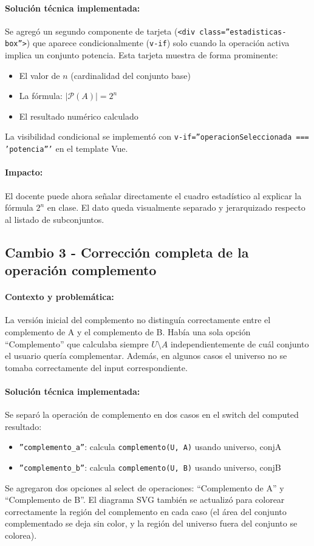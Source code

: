 \documentclass[11pt,a4paper]{article}
\begin{document}
\paragraph{Solución técnica implementada:}
Se agregó un segundo componente de tarjeta (\texttt{<div class=''estadisticas-box''>}) que aparece condicionalmente (\texttt{v-if}) solo cuando la operación activa implica un conjunto potencia. Esta tarjeta muestra de forma prominente:
\begin{itemize}[noitemsep]
    \item El valor de $n$ (cardinalidad del conjunto base)
    \item La fórmula: $|\mathcal{P}(A)| = 2^n$
    \item El resultado numérico calculado
\end{itemize}
La visibilidad condicional se implementó con \texttt{v-if=''operacionSeleccionada === 'potencia'''} en el template Vue.

\paragraph{Impacto:}
El docente puede ahora señalar directamente el cuadro estadístico al explicar la fórmula $2^n$ en clase. El dato queda visualmente separado y jerarquizado respecto al listado de subconjuntos.

\subsection{Cambio 3 - Corrección completa de la operación complemento}
\paragraph{Contexto y problemática:}
La versión inicial del complemento no distinguía correctamente entre el complemento de A y el complemento de B. Había una sola opción ``Complemento'' que calculaba siempre $U \setminus A$ independientemente de cuál conjunto el usuario quería complementar. Además, en algunos casos el universo no se tomaba correctamente del input correspondiente.

\paragraph{Solución técnica implementada:}
Se separó la operación de complemento en dos casos en el switch del computed resultado:
\begin{itemize}[noitemsep]
    \item \texttt{''complemento\_a''}: calcula \texttt{complemento(U, A)} usando universo, conjA
    \item \texttt{''complemento\_b''}: calcula \texttt{complemento(U, B)} usando universo, conjB
\end{itemize}
Se agregaron dos opciones al select de operaciones: ``Complemento de A'' y ``Complemento de B''. El diagrama SVG también se actualizó para colorear correctamente la región del complemento en cada caso (el área del conjunto complementado se deja sin color, y la región del universo fuera del conjunto se colorea).
\end{document}
